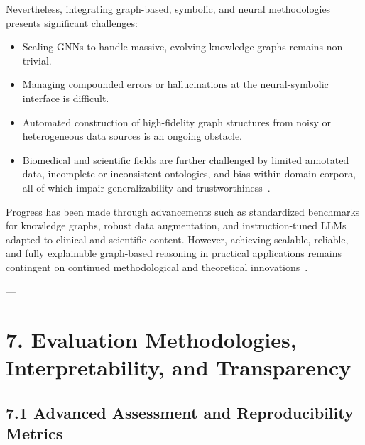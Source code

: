 \documentclass[11pt]{article}
\begin{document}
Nevertheless, integrating graph-based, symbolic, and neural methodologies presents significant challenges:
\begin{itemize}
    \item Scaling GNNs to handle massive, evolving knowledge graphs remains non-trivial.
    \item Managing compounded errors or hallucinations at the neural-symbolic interface is difficult.
    \item Automated construction of high-fidelity graph structures from noisy or heterogeneous data sources is an ongoing obstacle.
    \item Biomedical and scientific fields are further challenged by limited annotated data, incomplete or inconsistent ontologies, and bias within domain corpora, all of which impair generalizability and trustworthiness~\cite{reference36,reference43,reference45,reference53,reference55,reference87,reference94}.
\end{itemize}
Progress has been made through advancements such as standardized benchmarks for knowledge graphs, robust data augmentation, and instruction-tuned LLMs adapted to clinical and scientific content. However, achieving scalable, reliable, and fully explainable graph-based reasoning in practical applications remains contingent on continued methodological and theoretical innovations~\cite{reference2,reference3,reference18,reference19,reference36,reference47,reference48,reference49,reference50,reference55,reference61,reference62,reference80,reference87,reference88,reference89,reference94,reference95}.

---

\section{7. Evaluation Methodologies, Interpretability, and Transparency}

\subsection{7.1 Advanced Assessment and Reproducibility Metrics}
\end{document}
